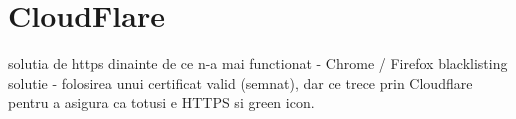 \section{CloudFlare}
	solutia de https dinainte
	de ce n-a mai functionat - Chrome / Firefox blacklisting
	solutie - folosirea unui certificat valid (semnat), dar ce trece prin Cloudflare pentru a asigura ca totusi e HTTPS si green icon.
